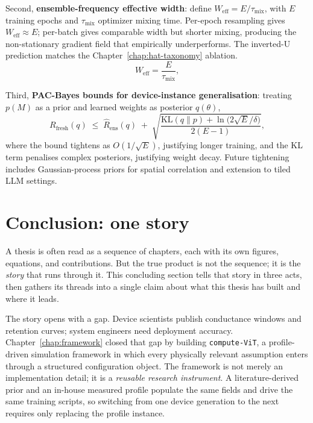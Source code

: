 Second, \textbf{ensemble-frequency effective width}: define $W_{\mathrm{eff}} = E / \tau_{\mathrm{mix}}$, with $E$ training epochs and $\tau_{\mathrm{mix}}$ optimizer mixing time.  Per-epoch resampling gives $W_{\mathrm{eff}}\approx E$; per-batch gives comparable width but shorter mixing, producing the non-stationary gradient field that empirically underperforms.  The inverted-U prediction matches the Chapter~\ref{chap:hat-taxonomy} ablation.
\begin{equation}
    W_{\mathrm{eff}} = \frac{E}{\tau_{\mathrm{mix}}},
    \label{eq:effective-width}
\end{equation}

Third, \textbf{PAC-Bayes bounds for device-instance generalisation}: treating $p(M)$ as a prior and learned weights as posterior $q(\theta)$,
\begin{equation}
    R_{\mathrm{fresh}}(q)
    \;\le\;
    \hat{R}_{\mathrm{ens}}(q)
    \;+\;
    \sqrt{\frac{\mathrm{KL}(q\|p) + \ln\bigl(2\sqrt{E}/\delta\bigr)}{2(E-1)}},
    \label{eq:pac-bayes}
\end{equation}
where the bound tightens as $O(1/\sqrt{E})$, justifying longer training, and the KL term penalises complex posteriors, justifying weight decay.  Future tightening includes Gaussian-process priors for spatial correlation and extension to tiled LLM settings.


\section{Conclusion: one story}
\label{sec:conclusion}

A thesis is often read as a sequence of chapters, each with its own figures, equations, and contributions.  But the true product is not the sequence; it is the \emph{story} that runs through it.  This concluding section tells that story in three acts, then gathers its threads into a single claim about what this thesis has built and where it leads.

The story opens with a gap.  Device scientists publish conductance windows and retention curves; system engineers need deployment accuracy.  Chapter~\ref{chap:framework} closed that gap by building \texttt{compute-ViT}, a profile-driven simulation framework in which every physically relevant assumption enters through a structured configuration object.  The framework is not merely an implementation detail; it is a \emph{reusable research instrument}.  A literature-derived prior and an in-house measured profile populate the same fields and drive the same training scripts, so switching from one device generation to the next requires only replacing the profile instance.

